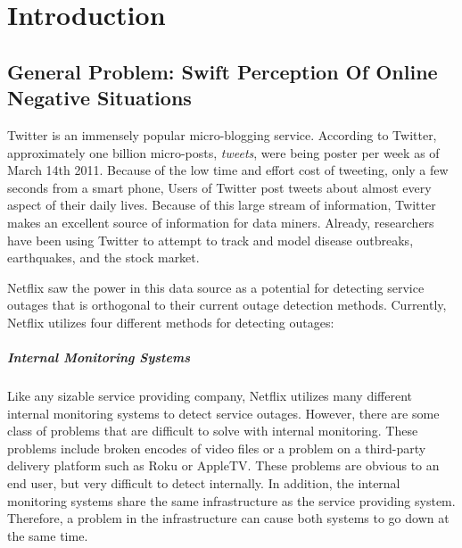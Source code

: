 \documentclass[12pt]{ucthesis}
\begin{document}
\pagestyle{plain}

\renewcommand{\baselinestretch}{1.66}


\chapter{Introduction}
\label{introduction}

\section{General Problem: Swift Perception Of Online Negative Situations}
\label{general-problem}

Twitter is an immensely popular micro-blogging service. According to Twitter,
approximately one billion micro-posts, \emph{tweets}, were being poster per week as of March 14th 2011\cite{TwitterBlog}.
Because of the low time and effort cost of tweeting, only a few seconds from a smart phone,
Users of Twitter post tweets about almost every aspect of their daily lives.
Because of this large stream of information, Twitter makes an excellent source of information for
data miners. Already, researchers have been using Twitter to attempt to track and model
disease outbreaks\cite{DetectingInfluenza}, earthquakes\cite{Earthquakes}, and the
stock market\cite{StockMarket}.

Netflix saw the power in this data source as a potential for detecting service outages that
is orthogonal to their current outage detection methods. Currently, Netflix utilizes four
different methods for detecting outages:

\paragraph{Internal Monitoring Systems}
Like any sizable service providing company, Netflix utilizes many different internal monitoring
systems to detect service outages. However, there are some class of problems that are difficult to solve
with internal monitoring. These problems include broken encodes of video files or a problem on a third-party delivery
platform such as Roku or AppleTV. These problems are obvious to an end user, but very difficult to detect internally.
In addition, the internal monitoring systems share the same infrastructure as the service providing system. Therefore,
a problem in the infrastructure can cause both systems to go down at the same time.
\end{document}
